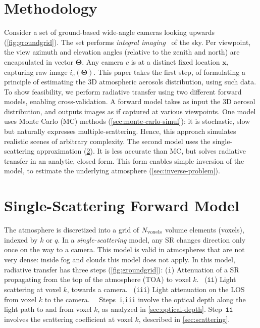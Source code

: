 \documentclass[10pt,letterpaper]{article}
\begin{document}

\section{Methodology}
\label{sec:methodology}

Consider a set of ground-based wide-angle cameras
looking upwards (\cref{fig:groundgrid}). The set performs {\em
  integral imaging}~\cite{integral} of the sky. Per viewpoint, the
view azimuth and elevation angles (relative to the zenith and north)
are encapsulated in vector ${\bm{\Theta}}$. Any camera $c$ is at a
distinct fixed location ${\bm x}$, capturing raw image
$i_c({\bm{\Theta}})$. This paper takes the first step, of formulating
a principle of estimating the 3D atmospheric aerosols distribution,
using such data. To show feasibility, we perform radiative transfer
using two different forward models, enabling cross-validation.  A
forward model takes as input the 3D aerosol distribution, and outputs
images as if captured at various viewpoints. One model uses Monte
Carlo (MC) methods (\cref{sec:monte-carlo-simul}): it is stochastic,
slow but naturally expresses multiple-scattering. Hence, this approach
simulates realistic scenes of arbitrary complexity.  The second model
uses the single-scattering approximation
(\cref{sec:single-scatt-model}). It is less accurate than MC, but
solves radiative transfer in an analytic, closed form. This form enables simple inversion of the model, to
estimate the underlying atmosphere (\cref{sec:inverse-problem}).


\section{Single-Scattering Forward Model}
\label{sec:single-scatt-model}

The atmosphere is discretized into a grid of $N_{\rm voxels}$ volume
elements (voxels), indexed by $k$ or $q$. In a
\emph{single-scattering} model, any SR changes direction only once on
the way to a camera. This model is valid in atmospheres that are not
very dense: inside fog and clouds this model does not apply. In this
model, radiative transfer has three steps (\cref{fig:groundgrid}):
({\tt i}) Attenuation of a SR propagating from the top of the
atmosphere (TOA) to voxel $k$. ~({\tt ii}) Light scattering at voxel
$k$, towards a camera. ~({\tt iii}) Light attenuation on the LOS from
voxel $k$ to the camera.~~ Steps~{\tt i},{\tt iii} involve the optical
depth along the light path to and from voxel $k$, as analyzed in
\cref{sec:optical-depth}.  Step~{\tt ii} involves the scattering
coefficient at voxel $k$, described in \cref{sec:scattering}.
\end{document}

